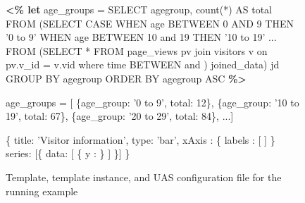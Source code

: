 \begin{figure}
\centering
%
%
\begin{minipage}[c]{7.5cm}
%
\begin{minipage}[c]{7.5cm}
\begin{code}
\textbf{<\% let} age_groups = 
   SELECT agegroup, count(*) AS total 
   FROM (SELECT CASE
    WHEN age BETWEEN 0 AND 9 THEN '0 to 9'
    WHEN age BETWEEN 10 and 19 THEN '10 to 19'
     ...
    FROM (SELECT * FROM page_views pv join visitors v 
          on pv.v_id = v.vid where time BETWEEN 
           and 
          ) joined_data) jd
   GROUP BY agegroup  
   ORDER BY agegroup ASC \textbf{\%>}
\end{code}
\vspace*{-0.4cm}
\label{figure:running-example:age-group-data-retrieval}
\vspace*{0cm}
\end{minipage}

\begin{minipage}[c]{7.5cm}
\begin{code}
age_groups = [
   \{age_group: '0 to 9', total: 12\}, 
   \{age_group: '10 to 19', total: 67\},
   \{age_group: '20 to 29', total: 84\},  ...]
\end{code}
\vspace*{-0.4cm}
\label{figure:running-example:age-group-query-result}
\vspace*{-0.2cm}
\end{minipage}
%
\end{minipage}
\hspace{1cm}
\begin{minipage}[c]{6cm}

\begin{minipage}[c]{8.5cm}
\begin{code}
  \{
    title: 'Visitor information',
    type: 'bar',
    xAxis : \{ 
      labels : [
        ]
    \}
    series: [\{
      data: [ 
          \{
            y  : 
          \}
         ]
    \}]
  \}
\end{code}
\vspace*{-0.4cm}
\vspace*{0cm}
\label{figure:running-example:age-group-template}
\end{minipage}
\end{minipage}
\vspace*{-0.05cm}
\caption{Template, template instance, and UAS configuration file for the running example}
\vspace*{-0.3cm}
\end{figure}

